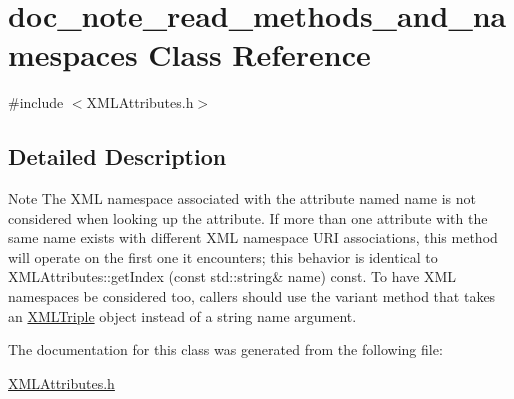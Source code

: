 \hypertarget{classdoc__note__read__methods__and__namespaces}{}\section{doc\+\_\+note\+\_\+read\+\_\+methods\+\_\+and\+\_\+namespaces Class Reference}
\label{classdoc__note__read__methods__and__namespaces}


{\ttfamily \#include $<$X\+M\+L\+Attributes.\+h$>$}



\subsection{Detailed Description}
\begin{DoxyNote}{Note}
The X\+ML namespace associated with the attribute named {\ttfamily name} is not considered when looking up the attribute. If more than one attribute with the same name exists with different X\+ML namespace U\+RI associations, this method will operate on the first one it encounters; this behavior is identical to X\+M\+L\+Attributes\+::get\+Index (const std\+::string\& name) const. To have X\+ML namespaces be considered too, callers should use the variant method that takes an \hyperlink{class_x_m_l_triple}{X\+M\+L\+Triple} object instead of a string {\ttfamily name} argument. 
\end{DoxyNote}


The documentation for this class was generated from the following file\+:\begin{DoxyCompactItemize}
\item 
\hyperlink{_x_m_l_attributes_8h}{X\+M\+L\+Attributes.\+h}\end{DoxyCompactItemize}
